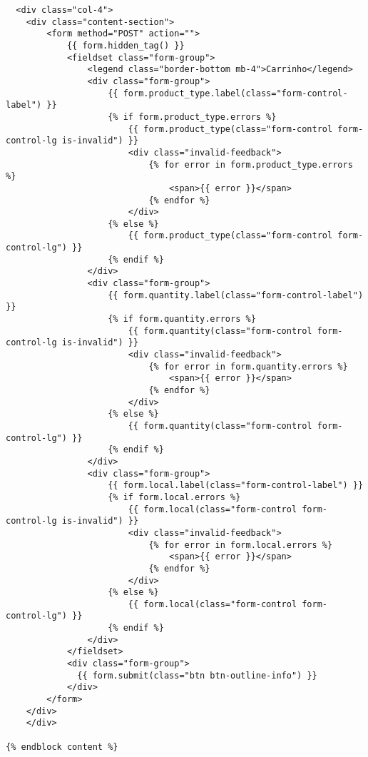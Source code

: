 \documentclass{report}
\begin{document}
\begin{lstlisting}
  <div class="col-4">
    <div class="content-section">
        <form method="POST" action="">
            {{ form.hidden_tag() }}
            <fieldset class="form-group">
                <legend class="border-bottom mb-4">Carrinho</legend>
                <div class="form-group">
                    {{ form.product_type.label(class="form-control-label") }}
                    {% if form.product_type.errors %}
                        {{ form.product_type(class="form-control form-control-lg is-invalid") }}
                        <div class="invalid-feedback">
                            {% for error in form.product_type.errors %}
                                <span>{{ error }}</span>
                            {% endfor %}
                        </div>
                    {% else %}
                        {{ form.product_type(class="form-control form-control-lg") }}
                    {% endif %}
                </div>
                <div class="form-group">
                    {{ form.quantity.label(class="form-control-label") }}
                    {% if form.quantity.errors %}
                        {{ form.quantity(class="form-control form-control-lg is-invalid") }}
                        <div class="invalid-feedback">
                            {% for error in form.quantity.errors %}
                                <span>{{ error }}</span>
                            {% endfor %}
                        </div>
                    {% else %}
                        {{ form.quantity(class="form-control form-control-lg") }}
                    {% endif %}
                </div>
                <div class="form-group">
                    {{ form.local.label(class="form-control-label") }}
                    {% if form.local.errors %}
                        {{ form.local(class="form-control form-control-lg is-invalid") }}
                        <div class="invalid-feedback">
                            {% for error in form.local.errors %}
                                <span>{{ error }}</span>
                            {% endfor %}
                        </div>
                    {% else %}
                        {{ form.local(class="form-control form-control-lg") }}
                    {% endif %}
                </div>
            </fieldset>
            <div class="form-group">
              {{ form.submit(class="btn btn-outline-info") }}
            </div>
        </form>
    </div>
    </div>

{% endblock content %}
\end{lstlisting}
\end{document}
